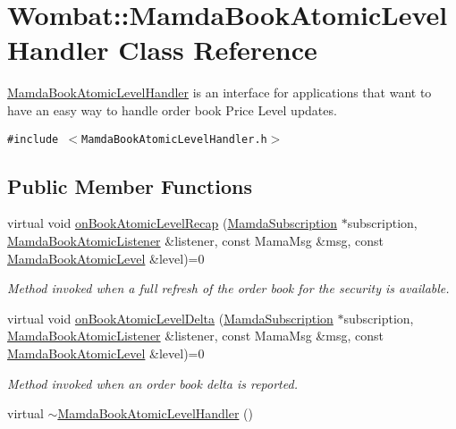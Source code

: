 \hypertarget{classWombat_1_1MamdaBookAtomicLevelHandler}{
\section{Wombat::Mamda\-Book\-Atomic\-Level\-Handler Class Reference}
\label{classWombat_1_1MamdaBookAtomicLevelHandler}
}
\hyperlink{classWombat_1_1MamdaBookAtomicLevelHandler}{Mamda\-Book\-Atomic\-Level\-Handler} is an interface for applications that want to have an easy way to handle order book Price Level updates.  


{\tt \#include $<$Mamda\-Book\-Atomic\-Level\-Handler.h$>$}

\subsection*{Public Member Functions}
\begin{CompactItemize}
\item 
virtual void \hyperlink{classWombat_1_1MamdaBookAtomicLevelHandler_6963551b1b7a9db1b1a61168a9fdd224}{on\-Book\-Atomic\-Level\-Recap} (\hyperlink{classWombat_1_1MamdaSubscription}{Mamda\-Subscription} $\ast$subscription, \hyperlink{classWombat_1_1MamdaBookAtomicListener}{Mamda\-Book\-Atomic\-Listener} \&listener, const Mama\-Msg \&msg, const \hyperlink{classWombat_1_1MamdaBookAtomicLevel}{Mamda\-Book\-Atomic\-Level} \&level)=0
\begin{CompactList}\small\item\em Method invoked when a full refresh of the order book for the security is available. \item\end{CompactList}\item 
virtual void \hyperlink{classWombat_1_1MamdaBookAtomicLevelHandler_657f1428d6744b3580ca814791d5a0b5}{on\-Book\-Atomic\-Level\-Delta} (\hyperlink{classWombat_1_1MamdaSubscription}{Mamda\-Subscription} $\ast$subscription, \hyperlink{classWombat_1_1MamdaBookAtomicListener}{Mamda\-Book\-Atomic\-Listener} \&listener, const Mama\-Msg \&msg, const \hyperlink{classWombat_1_1MamdaBookAtomicLevel}{Mamda\-Book\-Atomic\-Level} \&level)=0
\begin{CompactList}\small\item\em Method invoked when an order book delta is reported. \item\end{CompactList}\item 
virtual \hyperlink{classWombat_1_1MamdaBookAtomicLevelHandler_462755635d681d8330b3db084532b9c7}{$\sim$Mamda\-Book\-Atomic\-Level\-Handler} ()
\end{CompactItemize}


